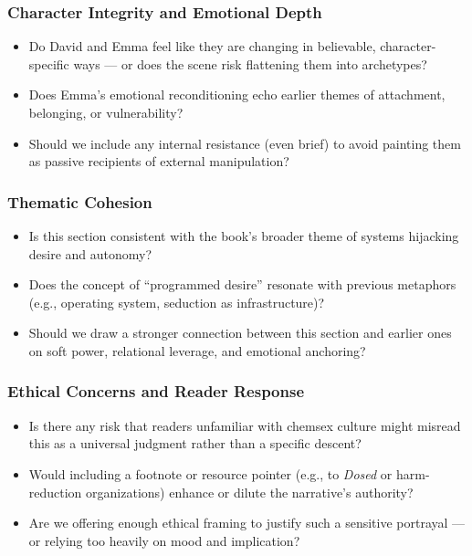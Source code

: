 \subsubsection*{Character Integrity and Emotional Depth}

\begin{itemize}
  \item Do David and Emma feel like they are changing in believable, character-specific ways — or does the scene risk flattening them into archetypes?
  \item Does Emma’s emotional reconditioning echo earlier themes of attachment, belonging, or vulnerability?
  \item Should we include any internal resistance (even brief) to avoid painting them as passive recipients of external manipulation?
\end{itemize}

\subsubsection*{Thematic Cohesion}

\begin{itemize}
  \item Is this section consistent with the book’s broader theme of systems hijacking desire and autonomy?
  \item Does the concept of “programmed desire” resonate with previous metaphors (e.g., operating system, seduction as infrastructure)?
  \item Should we draw a stronger connection between this section and earlier ones on soft power, relational leverage, and emotional anchoring?
\end{itemize}

\subsubsection*{Ethical Concerns and Reader Response}

\begin{itemize}
  \item Is there any risk that readers unfamiliar with chemsex culture might misread this as a universal judgment rather than a specific descent?
  \item Would including a footnote or resource pointer (e.g., to \textit{Dosed} or harm-reduction organizations) enhance or dilute the narrative’s authority?
  \item Are we offering enough ethical framing to justify such a sensitive portrayal — or relying too heavily on mood and implication?
\end{itemize}


